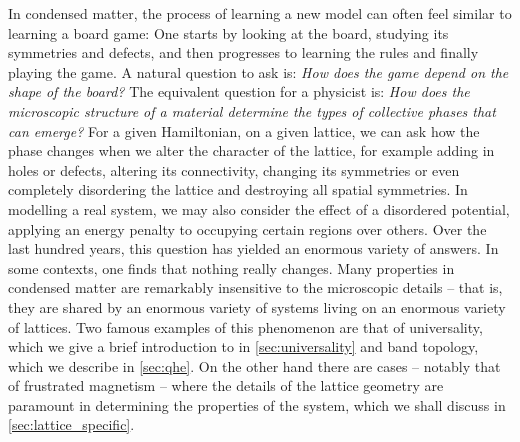 In condensed matter, the process of learning a new model can often feel similar to learning a board game: One starts by looking at the board, studying its symmetries and defects, and then progresses to learning the rules and finally playing the game. A natural question to ask is: \textit{How does the game depend on the shape of the board?} The equivalent question for a physicist is: \textit{How does the microscopic structure of a material determine the types of collective phases that can emerge?} For a given Hamiltonian, on a given lattice, we can ask how the phase changes when we alter the character of the lattice, for example adding in holes or defects, altering its connectivity, changing its symmetries or even completely disordering the lattice and destroying all spatial symmetries. In modelling a real system, we may also consider the effect of a disordered potential, applying an energy penalty to occupying certain regions over others. Over the last hundred years, this question has yielded an enormous variety of answers.   In some contexts, one finds that nothing really changes. Many properties in condensed matter are remarkably insensitive to the microscopic details -- that is, they are shared by an enormous variety of systems living on an enormous variety of lattices. Two famous examples of this phenomenon are that of universality, which we give a brief introduction to in \textsection\ref{sec:universality} and band topology, which we describe in \textsection\ref{sec:qhe}. On the other hand there are cases -- notably that of frustrated magnetism -- where the details of the lattice geometry are paramount in determining the properties of the system, which we shall discuss in \textsection\ref{sec:lattice_specific}. 


